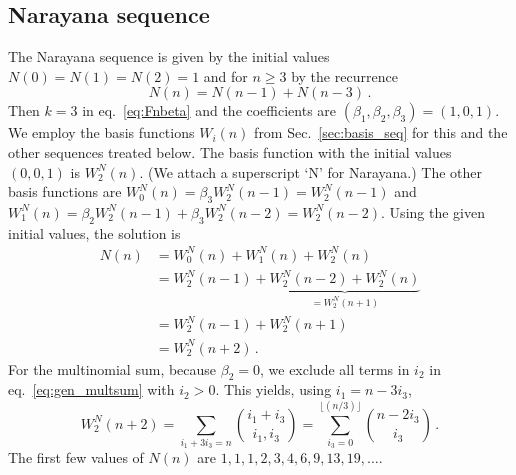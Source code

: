 \documentclass[review]{elsarticle}
\theoremstyle{plain}
\begin{document}
\subsection{Narayana sequence}
The Narayana sequence is given by the initial values $N(0)=N(1)=N(2)=1$ and for $n\ge3$ by the recurrence
\begin{equation}
\label{eq:Narayana_rec}  
N(n) = N(n-1) + N(n-3) \,.
\end{equation}
Then $k=3$ in eq.~\eqref{eq:Fnbeta} and the coefficients are
$(\beta_1,\beta_2,\beta_3)=(1,0,1)$.
We employ the basis functions $W_i(n)$ from Sec.~\ref{sec:basis_seq}
for this and the other sequences treated below.
The basis function with the initial values $(0,0,1)$ is $W^N_2(n)$. 
(We attach a superscript `N' for Narayana.)
The other basis functions are
$W^N_0(n)=\beta_3W^N_2(n-1)=W^N_2(n-1)$
and
$W^N_1(n)=\beta_2W^N_2(n-1)+\beta_3W^N_2(n-2) =W^N_2(n-2)$.
Using the given initial values, the solution is
\begin{equation}
\begin{split}
N(n) &= W^N_0(n) +W^N_1(n) +W^N_2(n)
\\
&= W^N_2(n-1) + \underbrace{W^N_2(n-2) +W^N_2(n)}_{=W^N_2(n+1)}
\\
&= W^N_2(n-1) +W^N_2(n+1)
\\
&= W^N_2(n+2) \,.
\end{split}
\end{equation}
For the multinomial sum, because $\beta_2=0$, we exclude all terms in $i_2$ in eq.~\eqref{eq:gen_multsum} with $i_2>0$.
This yields, using $i_1 = n-3i_3$,
\begin{equation}
W^N_2(n+2) = \sum_{i_1+3i_3= n} \binom{i_1+i_3}{i_1,i_3}
  = \sum_{i_3=0}^{\lfloor(n/3)\rfloor} \binom{n-2i_3}{i_3} \,.
\end{equation}
The first few values of $N(n)$ are $1,1,1,2,3,4,6,9,13,19,\dots$.
\end{document}
